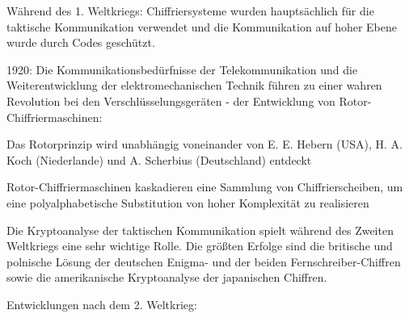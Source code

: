 \documentclass[a4paper]{article}
\begin{document}
\begin{multicols}{3}
\begin{itemize*}
            \begin{itemize*}
                  \item Während des 1. Weltkriegs: Chiffriersysteme wurden hauptsächlich für die taktische Kommunikation verwendet und die Kommunikation auf hoher Ebene wurde durch Codes geschützt.
                  \item 1920: Die Kommunikationsbedürfnisse der Telekommunikation und die Weiterentwicklung der elektromechanischen Technik führen zu einer wahren Revolution bei den Verschlüsselungsgeräten - der Entwicklung von Rotor-Chiffriermaschinen:
                  \begin{itemize*} \item Das Rotorprinzip wird unabhängig voneinander von E. E. Hebern (USA), H. A. Koch (Niederlande) und A. Scherbius (Deutschland) entdeckt \item Rotor-Chiffriermaschinen kaskadieren eine Sammlung von Chiffrierscheiben, um eine polyalphabetische Substitution von hoher Komplexität zu realisieren \item Die Kryptoanalyse der taktischen Kommunikation spielt während des Zweiten Weltkriegs eine sehr wichtige Rolle. Die größten Erfolge sind die britische und polnische Lösung der deutschen Enigma- und der beiden Fernschreiber-Chiffren sowie die amerikanische Kryptoanalyse der japanischen Chiffren. \end{itemize*}
            \end{itemize*}
            \item
            Entwicklungen nach dem 2. Weltkrieg:


\end{itemize*}
\end{multicols}
\end{document}

